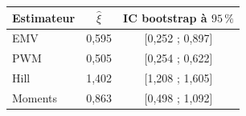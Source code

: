\begin{center}\small
\begin{tabular}{lcc}\toprule Estimateur & $\hat\xi$ & IC bootstrap à $95\,\%$ \\\midrule
EMV & 0{,}595 & [0{,}252 ; 0{,}897] \\
PWM & 0{,}505 & [0{,}254 ; 0{,}622] \\
Hill & 1{,}402 & [1{,}208 ; 1{,}605] \\
Moments & 0{,}863 & [0{,}498 ; 1{,}092] \\
\bottomrule\end{tabular}\end{center}
